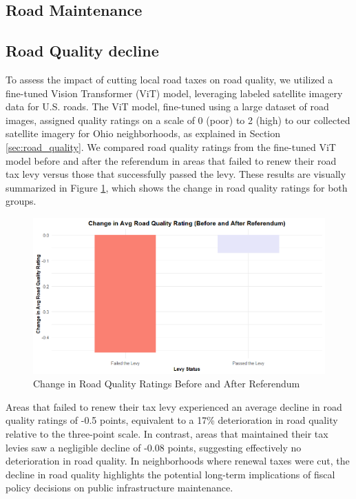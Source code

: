 
\subsection{Road Maintenance}

\subsection{Road Quality decline}

 To assess the impact of cutting local road taxes on road quality, we utilized a fine-tuned Vision Transformer (ViT) model, leveraging labeled satellite imagery data for U.S. roads. The ViT model, fine-tuned using a large dataset of road images, assigned quality ratings on a scale of 0 (poor) to 2 (high) to our collected satellite imagery for Ohio neighborhoods, as explained in Section \ref{sec:road_quality}. We compared road quality ratings from the fine-tuned ViT model before and after the referendum in areas that failed to renew their road tax levy versus those that successfully passed the levy. These results are visually summarized in Figure \ref{fig:road_quality_change}, which shows the change in road quality ratings for both groups. 


\begin{figure}[htbp]
    \centering
    \includegraphics[width=\textwidth,keepaspectratio]{images/road_quality_change.png}
    \caption{Change in Road Quality Ratings Before and After Referendum}
    \label{fig:road_quality_change}
\end{figure}

Areas that failed to renew their tax levy experienced an average decline in road quality ratings of -0.5 points, equivalent to a 17\% deterioration in road quality relative to the three-point scale. In contrast, areas that maintained their tax levies saw a negligible decline of -0.08 points, suggesting effectively no deterioration in road quality. In neighborhoods where renewal taxes were cut, the decline in road quality highlights the potential long-term implications of fiscal policy decisions on public infrastructure maintenance.

